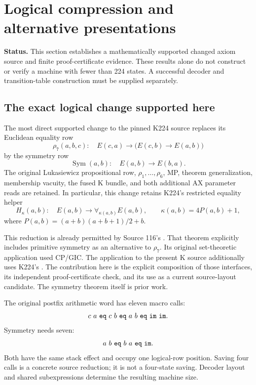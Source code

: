 \section{Logical compression and alternative presentations}
\label{sec:logical-compression}

\noindent\textbf{Status.} This section establishes a mathematically
supported changed axiom source and finite proof-certificate evidence.
These results alone do not construct or verify a machine with fewer than
224 states.  A successful decoder and transition-table construction must
be supplied separately.

\subsection{The exact logical change supported here}

The most direct supported change to the pinned K224 source replaces its
Euclidean equality row
\[
 \rho_7(a,b,c):\quad E(c,a)\to\bigl(E(c,b)\to E(a,b)\bigr)
\]
by the symmetry row
\[
 \operatorname{Sym}(a,b):\quad E(a,b)\to E(b,a).
\]
The original Lukasiewicz propositional row, $\rho_1,\ldots,\rho_6$, MP,
theorem generalization, membership vacuity, the fused K bundle, and both
additional AX parameter reads are retained.  In particular, this change
retains K224's restricted equality helper
\[
 H_{\kappa}(a,b):\quad E(a,b)\to\forall_{\kappa(a,b)} E(a,b),
 \qquad \kappa(a,b)=4P(a,b)+1,
\]
where $P(a,b)=(a+b)(a+b+1)/2+b$.

This reduction is already permitted by Source 116's
.
That theorem explicitly includes primitive symmetry as an alternative to
$\rho_7$.  Its original set-theoretic application used CP/GIC.  The
application to the present K source additionally uses K224's
.  The contribution
here is the explicit composition of those interfaces, its independent
proof-certificate check, and its use as a current source-layout candidate.
The symmetry theorem itself is prior work.

The original postfix arithmetic word has eleven macro calls:
\[
 c\ a\ {\tt eq}\ c\ b\ {\tt eq}\ a\ b\ {\tt eq}\ {\tt im}\ {\tt im}.
\]
Symmetry needs seven:
\[
 a\ b\ {\tt eq}\ b\ a\ {\tt eq}\ {\tt im}.
\]
Both have the same stack effect and occupy one logical-row position.
Saving four calls is a concrete source reduction; it is not a four-state
saving.  Decoder layout and shared subexpressions determine the resulting
machine size.

